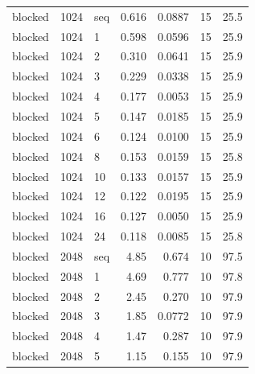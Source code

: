 \begin{table}[!ht]
\begin{tabular}{@{}lrlrrrr@{}}
blocked & 1024 & seq & 0.616 & 0.0887 & 15 & 25.5 \\
blocked & 1024 & 1 & 0.598 & 0.0596 & 15 & 25.9 \\
blocked & 1024 & 2 & 0.310 & 0.0641 & 15 & 25.9 \\
blocked & 1024 & 3 & 0.229 & 0.0338 & 15 & 25.9 \\
blocked & 1024 & 4 & 0.177 & 0.0053 & 15 & 25.9 \\
blocked & 1024 & 5 & 0.147 & 0.0185 & 15 & 25.9 \\
blocked & 1024 & 6 & 0.124 & 0.0100 & 15 & 25.9 \\
blocked & 1024 & 8 & 0.153 & 0.0159 & 15 & 25.8 \\
blocked & 1024 & 10 & 0.133 & 0.0157 & 15 & 25.9 \\
blocked & 1024 & 12 & 0.122 & 0.0195 & 15 & 25.9 \\
blocked & 1024 & 16 & 0.127 & 0.0050 & 15 & 25.9 \\
blocked & 1024 & 24 & 0.118 & 0.0085 & 15 & 25.8 \\
blocked & 2048 & seq & 4.85 & 0.674 & 10 & 97.5 \\
blocked & 2048 & 1 & 4.69 & 0.777 & 10 & 97.8 \\
blocked & 2048 & 2 & 2.45 & 0.270 & 10 & 97.9 \\
blocked & 2048 & 3 & 1.85 & 0.0772 & 10 & 97.9 \\
blocked & 2048 & 4 & 1.47 & 0.287 & 10 & 97.9 \\
blocked & 2048 & 5 & 1.15 & 0.155 & 10 & 97.9 \\
\bottomrule
\end{tabular}
\end{table}
